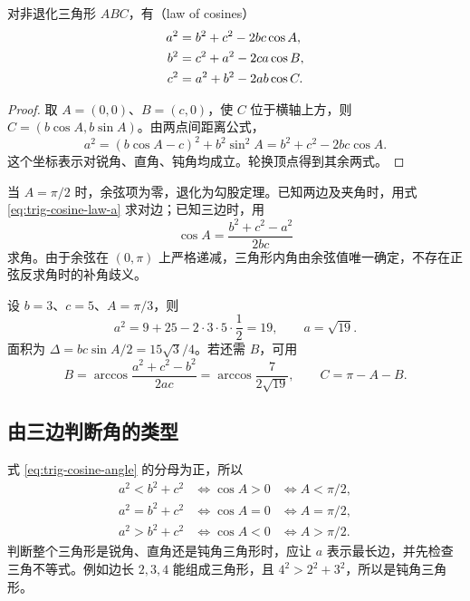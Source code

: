 \documentclass[UTF8]{ctexart}
\begin{document}
\begin{theorem}[余弦定理]
对非退化三角形 $ABC$，有（law of cosines）
\begin{align}
  a^2&=b^2+c^2-2bc\cos A,\label{eq:trig-cosine-law-a}\\
  b^2&=c^2+a^2-2ca\cos B,\notag\\
  c^2&=a^2+b^2-2ab\cos C.\notag
\end{align}
\end{theorem}

\begin{proof}
取 $A=(0,0)$、$B=(c,0)$，使 $C$ 位于横轴上方，则 $C=(b\cos A,b\sin A)$。由两点间距离公式，
\[
  a^2=(b\cos A-c)^2+b^2\sin^2A
  =b^2+c^2-2bc\cos A.
\]
这个坐标表示对锐角、直角、钝角均成立。轮换顶点得到其余两式。
\end{proof}

当 $A=\pi/2$ 时，余弦项为零，退化为勾股定理。已知两边及夹角时，用式 \eqref{eq:trig-cosine-law-a} 求对边；已知三边时，用
\begin{equation}\label{eq:trig-cosine-angle}
  \boxed{\cos A=\frac{b^2+c^2-a^2}{2bc}}
\end{equation}
求角。由于余弦在 $(0,\pi)$ 上严格递减，三角形内角由余弦值唯一确定，不存在正弦反求角时的补角歧义。

\begin{example}[两边及夹角求第三边]
设 $b=3$、$c=5$、$A=\pi/3$，则
\[
  a^2=9+25-2\cdot3\cdot5\cdot\frac12=19,
  \qquad a=\sqrt{19}.
\]
面积为 $\Delta=bc\sin A/2=15\sqrt3/4$。若还需 $B$，可用
\[
  B=\arccos\frac{a^2+c^2-b^2}{2ac}
   =\arccos\frac7{2\sqrt{19}},\qquad C=\pi-A-B.
\]
\end{example}

\subsection{由三边判断角的类型}

式 \eqref{eq:trig-cosine-angle} 的分母为正，所以
\[
\begin{array}{lll}
  a^2<b^2+c^2 &\Longleftrightarrow \cos A>0 &\Longleftrightarrow A<\pi/2,\\
  a^2=b^2+c^2 &\Longleftrightarrow \cos A=0 &\Longleftrightarrow A=\pi/2,\\
  a^2>b^2+c^2 &\Longleftrightarrow \cos A<0 &\Longleftrightarrow A>\pi/2.
\end{array}
\]
判断整个三角形是锐角、直角还是钝角三角形时，应让 $a$ 表示最长边，并先检查三角不等式。例如边长 $2,3,4$ 能组成三角形，且 $4^2>2^2+3^2$，所以是钝角三角形。
\end{document}
